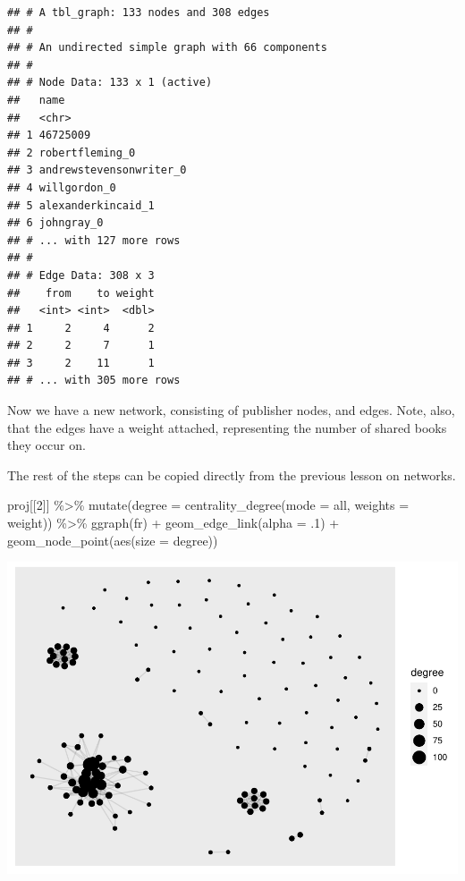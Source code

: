 \documentclass[
]{book}
\newenvironment{Shaded}{\begin{snugshade}}{\end{snugshade}}
\newcommand{\AttributeTok}[1]{\textcolor[rgb]{0.77,0.63,0.00}{#1}}
\newcommand{\DecValTok}[1]{\textcolor[rgb]{0.00,0.00,0.81}{#1}}
\newcommand{\FunctionTok}[1]{\textcolor[rgb]{0.00,0.00,0.00}{#1}}
\newcommand{\NormalTok}[1]{#1}
\newcommand{\SpecialCharTok}[1]{\textcolor[rgb]{0.00,0.00,0.00}{#1}}
\newcommand{\StringTok}[1]{\textcolor[rgb]{0.31,0.60,0.02}{#1}}
\begin{document}
\begin{verbatim}
## # A tbl_graph: 133 nodes and 308 edges
## #
## # An undirected simple graph with 66 components
## #
## # Node Data: 133 x 1 (active)
##   name                   
##   <chr>                  
## 1 46725009               
## 2 robertfleming_0        
## 3 andrewstevensonwriter_0
## 4 willgordon_0           
## 5 alexanderkincaid_1     
## 6 johngray_0             
## # ... with 127 more rows
## #
## # Edge Data: 308 x 3
##    from    to weight
##   <int> <int>  <dbl>
## 1     2     4      2
## 2     2     7      1
## 3     2    11      1
## # ... with 305 more rows
\end{verbatim}

Now we have a new network, consisting of publisher nodes, and edges. Note, also, that the edges have a weight attached, representing the number of shared books they occur on.

The rest of the steps can be copied directly from the previous lesson on networks.

\begin{Shaded}
\begin{Highlighting}[]
\NormalTok{proj[[}\DecValTok{2}\NormalTok{]] }\SpecialCharTok{\%\textgreater{}\%} 
  \FunctionTok{mutate}\NormalTok{(}\AttributeTok{degree =} \FunctionTok{centrality\_degree}\NormalTok{(}\AttributeTok{mode =} \StringTok{\textquotesingle{}all\textquotesingle{}}\NormalTok{, }\AttributeTok{weights =}\NormalTok{ weight)) }\SpecialCharTok{\%\textgreater{}\%} 
  \FunctionTok{ggraph}\NormalTok{(}\StringTok{\textquotesingle{}fr\textquotesingle{}}\NormalTok{) }\SpecialCharTok{+} 
  \FunctionTok{geom\_edge\_link}\NormalTok{(}\AttributeTok{alpha =}\NormalTok{ .}\DecValTok{1}\NormalTok{) }\SpecialCharTok{+} 
  \FunctionTok{geom\_node\_point}\NormalTok{(}\FunctionTok{aes}\NormalTok{(}\AttributeTok{size =}\NormalTok{ degree))}
\end{Highlighting}
\end{Shaded}

\includegraphics{_main_files/figure-latex/unnamed-chunk-79-1.pdf}
\end{document}
